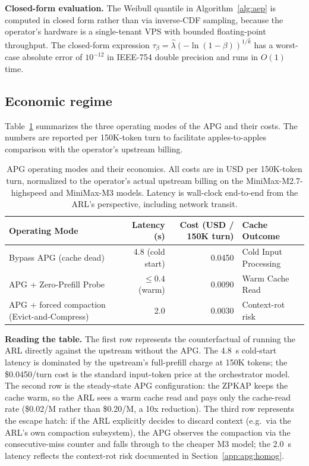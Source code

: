 \noindent
\textbf{Closed-form evaluation.} The Weibull quantile in
Algorithm~\ref{alg:aep} is computed in closed form rather than via
inverse-CDF sampling, because the operator's hardware is a
single-tenant VPS with bounded floating-point throughput. The
closed-form expression $\tau_\beta = \hat{\lambda}
(-\ln(1-\beta))^{1/\hat{k}}$ has a worst-case absolute error of
$10^{-12}$ in IEEE-754 double precision and runs in $O(1)$ time.

\subsection{Economic regime}
\label{app:apg:economy}

Table~\ref{tab:apg-econ} summarizes the three operating modes of the
APG and their costs. The numbers are reported per 150K-token turn
to facilitate apples-to-apples comparison with the operator's
upstream billing.

\begin{table}[ht]
\centering
\caption{APG operating modes and their economics. All costs are in
USD per 150K-token turn, normalized to the operator's actual upstream
billing on the MiniMax-M2.7-highspeed and MiniMax-M3 models. Latency
is wall-clock end-to-end from the ARL's perspective, including
network transit.}
\label{tab:apg-econ}
\begin{tabular}{lrrl}
\toprule
\textbf{Operating Mode} & \textbf{Latency (s)} & \textbf{Cost (USD / 150K turn)} & \textbf{Cache Outcome} \\
\midrule
Bypass APG (cache dead) & 4.8 (cold start) & 0.0450 & Cold Input Processing \\
APG + Zero-Prefill Probe & $\le 0.4$ (warm) & 0.0090 & Warm Cache Read \\
APG + forced compaction (Evict-and-Compress) & 2.0 & 0.0030 & Context-rot risk \\
\bottomrule
\end{tabular}
\end{table}

\noindent
\textbf{Reading the table.} The first row represents the
counterfactual of running the ARL directly against the upstream
without the APG. The 4.8~s cold-start latency is dominated by the
upstream's full-prefill charge at 150K tokens; the
\$0.0450/turn cost is the standard input-token price at the
orchestrator model. The second row is the steady-state APG
configuration: the ZPKAP keeps the cache warm, so the ARL sees a
warm cache read and pays only the cache-read rate (\$0.02/M rather
than \$0.20/M, a 10x reduction). The third row represents the
escape hatch: if the ARL explicitly decides to discard context
(e.g.\ via the ARL's own compaction subsystem), the APG observes
the compaction via the consecutive-miss counter and falls through
to the cheaper M3 model; the 2.0~s latency reflects the
context-rot risk documented in Section~\ref{app:apg:homog}.

